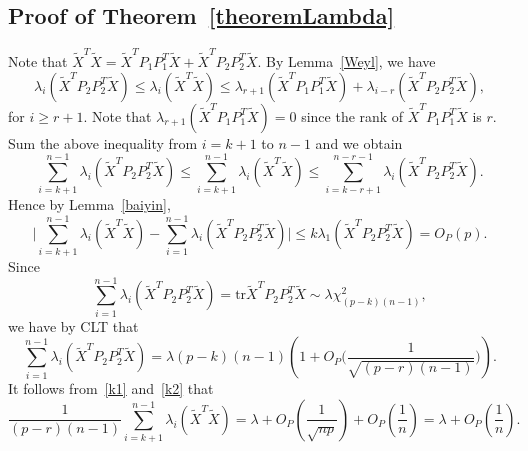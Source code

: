 \documentclass[review]{elsarticle}
\theoremstyle{plain}
\theoremstyle{definition}
\theoremstyle{remark}
\begin{document}
\subsection{Proof of Theorem~\ref{theoremLambda}}
Note that $\tilde{X}^T\tilde{X}=\tilde{X}^T P_1 P_1^T\tilde{X}+\tilde{X}^T P_2 P_2^T\tilde{X}$.
By Lemma~\ref{Weyl}, we have
\begin{equation*}
     \lambda_{i} (\tilde{X}^T P_2 P_2^T\tilde{X})
    \leq \lambda_{i} (\tilde{X}^T\tilde{X})
    \leq \lambda_{r+1} (\tilde{X}^T P_1 P_1^T\tilde{X})
    + \lambda_{i-r} (\tilde{X}^T P_2 P_2^T\tilde{X}),
\end{equation*}
for $i\geq r+1$. Note that $ \lambda_{r+1} (\tilde{X}^T P_1 P_1^T\tilde{X})=0$ since the rank of $\tilde{X}^T P_1 P_1^T\tilde{X}$ is $r$. Sum the above inequality from $i=k+1$ to $n-1$ and we obtain
\begin{equation*}
    \sum_{i=k+1}^{n-1}\lambda_{i} (\tilde{X}^T P_2 P_2^T\tilde{X})
    \leq \sum_{i=k+1}^{n-1}\lambda_{i} (\tilde{X}^T\tilde{X})
    \leq \sum_{i=k-r+1}^{n-r-1} \lambda_{i} (\tilde{X}^T P_2 P_2^T\tilde{X}).
\end{equation*}
Hence by Lemma~\ref{baiyin},
\begin{equation}\label{k1}
     \big|\sum_{i=k+1}^{n-1}\lambda_{i} (\tilde{X}^T\tilde{X})
    - \sum_{i=1}^{n-1} \lambda_{i} (\tilde{X}^T P_2 P_2^T\tilde{X})\big|\leq k \lambda_1(\tilde{X}^T P_2 P_2^T\tilde{X})= O_P(p).
\end{equation}
Since 
\begin{equation*}
   \sum_{i=1}^{n-1} \lambda_{i} (\tilde{X}^T P_2 P_2^T\tilde{X})= \textrm{tr}\tilde{X}^T P_2 P_2^T \tilde{X}\sim \lambda \chi^2_{(p-k)(n-1)},
\end{equation*}
we have by CLT that
\begin{equation}\label{k2}
    \sum_{i=1}^{n-1} \lambda_{i} (\tilde{X}^T P_2 P_2^T\tilde{X})=\lambda{(p-k)(n-1)}(1+O_P\big(\frac{1}{\sqrt{(p-r)(n-1)}}\big)).
\end{equation}
It follows from~\eqref{k1} and~\eqref{k2} that
\begin{equation*}
    \frac{1}{(p-r)(n-1)}\sum_{i=k+1}^{n-1}\lambda_{i} (\tilde{X}^T\tilde{X})=\lambda+O_P(\frac{1}{\sqrt{np}})+O_P(\frac{1}{n})=\lambda+O_P(\frac{1}{n}).
\end{equation*}
\end{document}
